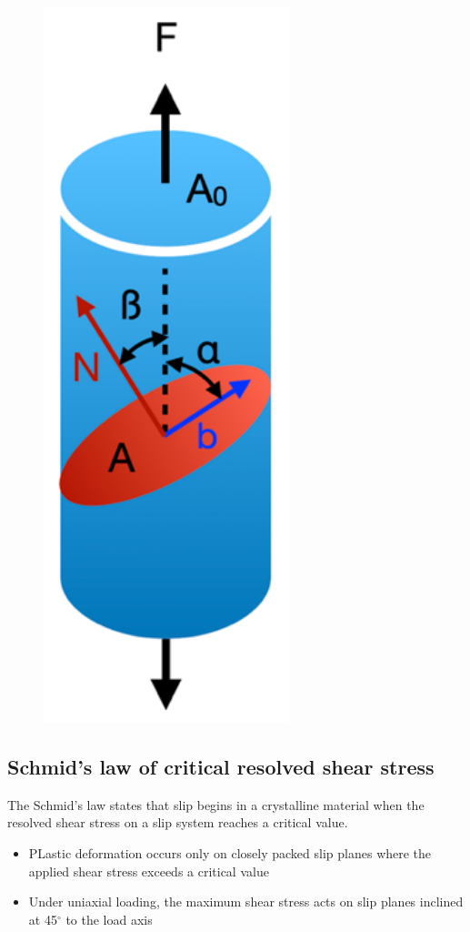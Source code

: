 \documentclass{article}
\begin{document}
\begin{figure}
  \centering
  \includegraphics[width=0.5\linewidth]{media/schmids_law.png}
\end{figure}

\phantom{}

\subsection{Schmid's law of critical resolved shear stress}
The Schmid's law states that slip begins in a crystalline material when the resolved shear
stress on a slip system reaches a critical value.
\begin{itemize}
  \item PLastic deformation occurs only on closely packed slip planes where the applied
    shear stress exceeds a critical value
  \item Under uniaxial loading, the maximum shear stress acts on slip planes inclined
    at 45$^\circ$ to the load axis
\end{itemize}
\wrapfill
\end{document}
